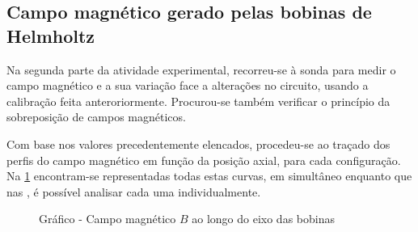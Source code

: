 \subsection{Campo magnético gerado pelas bobinas de Helmholtz}
Na segunda parte da atividade experimental, recorreu-se à sonda para medir o campo magnético e a sua variação face a alterações no circuito, usando a calibração feita anteroriormente. Procurou-se também verificar o princípio da sobreposição de campos magnéticos.

Com base nos valores precedentemente elencados, procedeu-se ao traçado dos perfis do campo magnético em função da posição axial, para cada configuração. Na \cref{gra:todas} encontram-se representadas todas estas curvas, em simultâneo enquanto que nas , é possível analisar cada uma individualmente.

\begin{figure}[!ht]
	\centering
	\caption{Gráfico - Campo magnético ${B}$ ao longo do eixo das bobinas}
	\label{gra:todas}
\end{figure}

